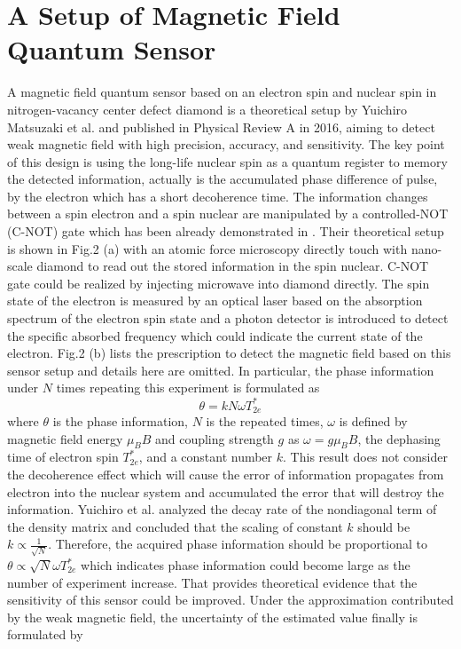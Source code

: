 \documentclass[11pt]{article}
\begin{document}
\section{A Setup of Magnetic Field Quantum Sensor}
A magnetic field quantum sensor based on an electron spin and nuclear spin in nitrogen-vacancy center defect diamond is a theoretical setup by Yuichiro Matsuzaki et al.\cite{matsuzaki2016hybrid} and published in Physical Review A in 2016, aiming to detect weak magnetic field with high precision, accuracy, and sensitivity. The key point of this design is using the long-life nuclear spin as a quantum register to memory the detected information, actually is the accumulated phase difference of pulse, by the electron which has a short decoherence time. The information changes between a spin electron and a spin nuclear are manipulated by a controlled-NOT (C-NOT) gate which has been already demonstrated in \cite{neumann2008multipartite}. Their theoretical setup is shown in Fig.2 (a) with an atomic force microscopy directly touch with nano-scale diamond to read out the stored information in the spin nuclear. C-NOT gate could be realized by injecting microwave into diamond directly. The spin state of the electron is measured by an optical laser based on the absorption spectrum of the electron spin state and a photon detector is introduced to detect the specific absorbed frequency which could indicate the current state of the electron. Fig.2 (b) lists the prescription to detect the magnetic field based on this sensor setup and details here are omitted. In particular, the phase information under $N$ times repeating this experiment is formulated as
\begin{equation}
	\theta = kN\omega T^*_{2e}
\end{equation}
where $\theta$ is the phase information, $N$ is the repeated times, $\omega$ is defined by magnetic field energy $\mu_B B$ and coupling strength $g$ as $\omega = g\mu_B B$, the dephasing time of electron spin $T^*_{2e}$, and a constant number $k$. This result does not consider the decoherence effect which will cause the error of information propagates from electron into the nuclear system and accumulated the error that will destroy the information. Yuichiro et al. analyzed the decay rate of the nondiagonal term of the density matrix and concluded that the scaling of constant $k$ should be $k \propto \frac{1}{\sqrt{N}}$. Therefore, the acquired phase information should be proportional to $\theta \propto \sqrt{N}\omega T^*_{2e}$ which indicates phase information could become large as the number of experiment increase. That provides theoretical evidence that the sensitivity of this sensor could be improved. Under the approximation contributed by the weak magnetic field, the uncertainty of the estimated value finally is formulated by
\end{document}
